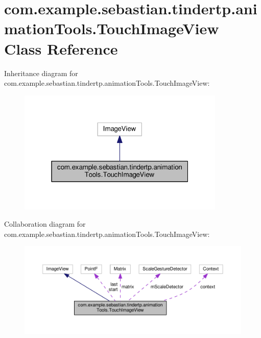 \hypertarget{classcom_1_1example_1_1sebastian_1_1tindertp_1_1animationTools_1_1TouchImageView}{}\section{com.\+example.\+sebastian.\+tindertp.\+animation\+Tools.\+Touch\+Image\+View Class Reference}
\label{classcom_1_1example_1_1sebastian_1_1tindertp_1_1animationTools_1_1TouchImageView}


Inheritance diagram for com.\+example.\+sebastian.\+tindertp.\+animation\+Tools.\+Touch\+Image\+View\+:
\nopagebreak
\begin{figure}[H]
\begin{center}
\leavevmode
\includegraphics[width=280pt]{classcom_1_1example_1_1sebastian_1_1tindertp_1_1animationTools_1_1TouchImageView__inherit__graph}
\end{center}
\end{figure}


Collaboration diagram for com.\+example.\+sebastian.\+tindertp.\+animation\+Tools.\+Touch\+Image\+View\+:
\nopagebreak
\begin{figure}[H]
\begin{center}
\leavevmode
\includegraphics[width=350pt]{classcom_1_1example_1_1sebastian_1_1tindertp_1_1animationTools_1_1TouchImageView__coll__graph}
\end{center}
\end{figure}
